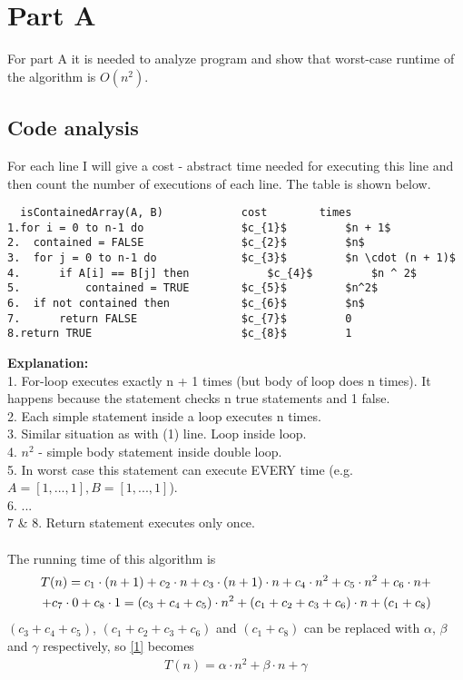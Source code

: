 \documentclass[12pt]{article}
\begin{document}
\section{Part A}
For part A it is needed to analyze program and show that worst-case runtime of the algorithm is $O(n^2)$.

\subsection{Code analysis}
For each line I will give a cost - abstract time needed for executing this line and then count the number of executions of each line. The table is shown below.

\begin{lstlisting}
  isContainedArray(A, B)			cost		times
1.for i = 0 to n-1 do				$c_{1}$			$n + 1$
2.	contained = FALSE				$c_{2}$			$n$
3.  for j = 0 to n-1 do				$c_{3}$			$n \cdot (n + 1)$
4.  	if A[i] == B[j] then			$c_{4}$			$n ^ 2$
5.   		contained = TRUE		$c_{5}$			$n^2$
6.	if not contained then			$c_{6}$			$n$
7.		return FALSE				$c_{7}$			0
8.return TRUE						$c_{8}$			1

\end{lstlisting}
\textbf{Explanation:}\\
1. For-loop executes exactly n + 1 times (but body of loop does n times). It happens because the statement checks n true statements and 1 false.\\
2. Each simple statement inside a loop executes n times.\\
3. Similar situation as with (1) line. Loop inside loop.\\
4. $n^2$ - simple body statement inside double loop.\\
5. In worst case this statement can execute EVERY time (e.g. $A = [1, ..., 1], B = [1,..., 1]$).\\
6. ...\\
7 \& 8. Return statement executes only once.\\\\
The running time of this algorithm is
\begin{align}\label{1}
    T(n) = c_{1}\cdot (n + 1) + c_{2}\cdot n + c_{3}\cdot(n + 1) \cdot n + c_{4}\cdot n^2 + c_{5}\cdot n^2 + c_{6}\cdot n + \notag\\ + c_{7}\cdot 0 + c_{8}\cdot 1 = ( c_{3} + c_{4} + c_{5} ) \cdot n^2 + ( c_{1} + c_{2} + c_{3} + c_{6} ) \cdot n + ( c_{1} + c_{8} )
\end{align}
$(c_{3} + c_{4} + c_{5})$, $(c_{1} + c_{2} + c_{3} + c_{6})$  and $(c_{1} + c_{8})$ can be replaced with $\alpha$, $\beta$ and $\gamma$ respectively, so \eqref{1} becomes
\begin{align}\label{2}
T(n) = \alpha \cdot n ^ 2 + \beta \cdot n + \gamma
\end{align}
\end{document}
